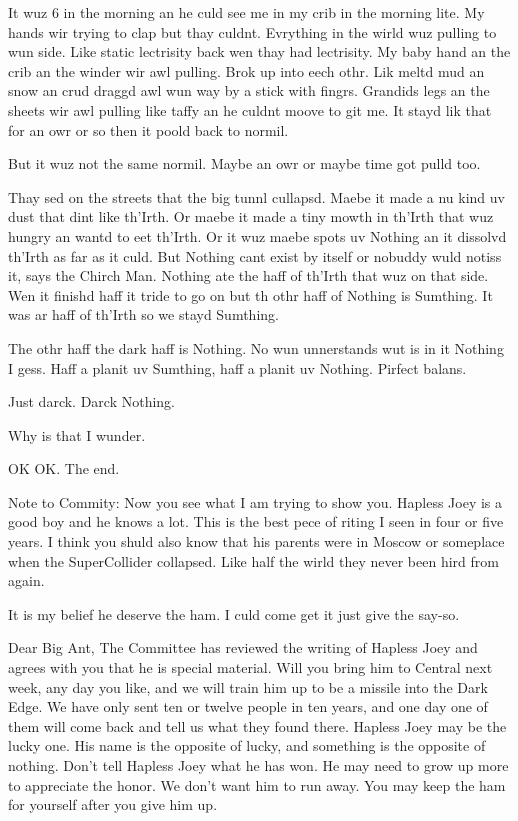\documentclass[10pt,a4paper]{article}
\begin{document}
It wuz 6 in the morning an he culd see me in my crib in the morning lite. My hands wir trying to clap but thay culdnt. Evrything in the wirld wuz pulling to wun side. Like static lectrisity back wen thay had lectrisity. My baby hand an the crib an the winder wir awl pulling. Brok up into eech othr. Lik meltd mud an snow an crud draggd awl wun way by a stick with fingrs. Grandids legs an the sheets wir awl pulling like taffy an he culdnt moove to git me. It stayd lik that for an owr or so then it poold back to normil.

But it wuz not the same normil. Maybe an owr or maybe time got pulld too.

Thay sed on the streets that the big tunnl cullapsd. Maebe it made a nu kind uv dust that dint like th’Irth. Or maebe it made a tiny mowth in th’Irth that wuz hungry an wantd to eet th’Irth. Or it wuz maebe spots uv Nothing an it dissolvd th’Irth as far as it culd. But Nothing cant exist by itself or nobuddy wuld notiss it, says the Chirch Man. Nothing ate the haff of th’Irth that wuz on that side. Wen it finishd haff it tride to go on but th othr haff of Nothing is Sumthing. It was ar haff of th’Irth so we stayd Sumthing.

The othr haff the dark haff is Nothing. No wun unnerstands wut is in it Nothing I gess. Haff a planit uv Sumthing, haff a planit uv Nothing. Pirfect balans.

Just darck. Darck Nothing.

Why is that I wunder.

OK OK. The end.

Note to Commity: Now you see what I am trying to show you. Hapless Joey is a good boy and he knows a lot. This is the best pece of riting I seen in four or five years. I think you shuld also know that his parents were in Moscow or someplace when the SuperCollider collapsed. Like half the wirld they never been hird from again.

It is my belief he deserve the ham. I culd come get it just give the say-so.

Dear Big Ant,
The Committee has reviewed the writing of Hapless Joey and agrees with you that he is special material. Will you bring him to Central next week, any day you like, and we will train him up to be a missile into the Dark Edge. We have only sent ten or twelve people in ten years, and one day one of them will come back and tell us what they found there. Hapless Joey may be the lucky one. His name is the opposite of lucky, and something is the opposite of nothing. Don’t tell Hapless Joey what he has won. He may need to grow up more to appreciate the honor. We don’t want him to run away. You may keep the ham for yourself after you give him up.
\end{document}
